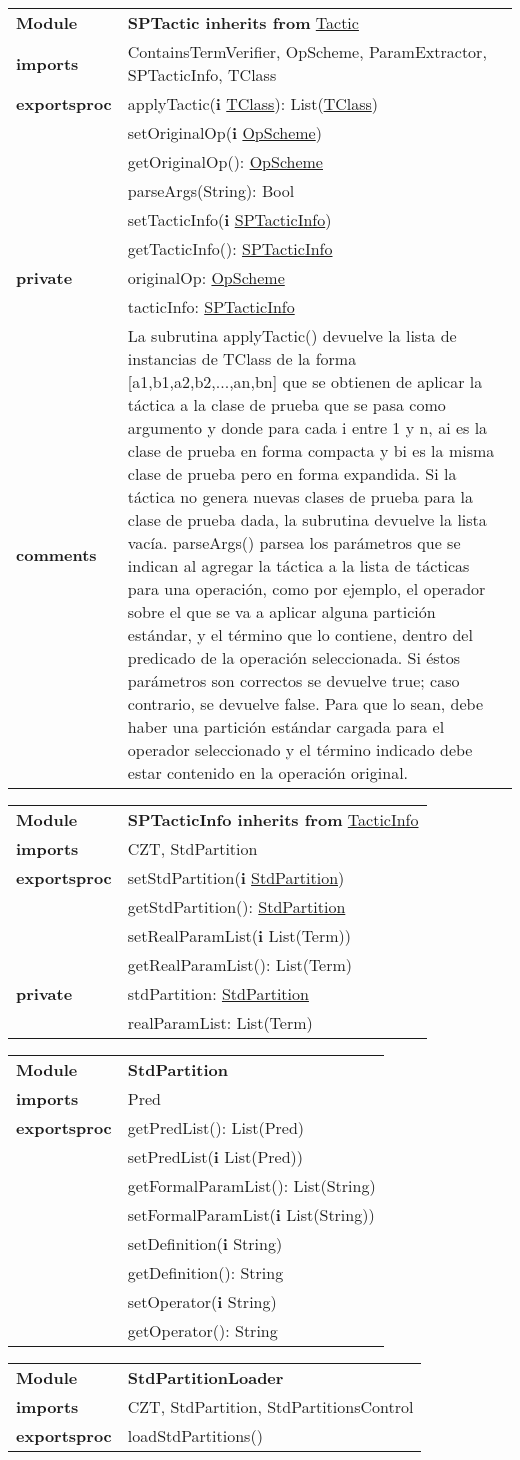 \documentclass[12pt,a4paper,fleqn]{report}
\newenvironment{module}[1]{\hypertarget{mi:#1}{} \vspace{0.5cm}\noindent\begin{tabular}{|p{0.2\textwidth} p{0.75\textwidth}|} \hline{\bf Module} & {\bf #1} \\}{\hline\end{tabular}\vspace{0.5cm}}
\newenvironment{hmodule}[2]{\hypertarget{mi:#1}{} \vspace{0.5cm}\noindent\begin{tabular}{|p{0.2\textwidth} p{0.75\textwidth}|} \hline{\bf Module} & {\bf #1 inherits from} \hyperlink{mi:#2}{#2} \\}{\hline\end{tabular}\vspace{0.5cm}}
\newcommand{\eproc}{{\bf exportsproc}}
\newcommand{\priv}{{\bf private}}
\newcommand{\proc}[1]{& #1 \\}
\newcommand{\e}[1]{{\bf i} \hyperlink{mi:#1}{#1}}
\newcommand{\eb}[1]{{\bf i} #1}
\newcommand{\imp}[1]{{\bf imports} & #1 \\}
\newcommand{\comm}[1]{{\bf comments} & #1 \\}
\newcommand{\mdr}[1]{\hyperlink{mi:#1}{#1}}
\begin{document}
\begin{hmodule}{SPTactic}{Tactic}
\imp{ContainsTermVerifier, OpScheme, ParamExtractor, SPTacticInfo, TClass}
\eproc
\proc{applyTactic(\e {TClass}): List(\mdr{TClass})}
\proc{setOriginalOp(\e {OpScheme})}
\proc{getOriginalOp(): \mdr{OpScheme}}
\proc{parseArgs(String): Bool}
\proc{setTacticInfo(\e {SPTacticInfo})}
\proc{getTacticInfo(): \mdr{SPTacticInfo}}
\priv
\proc{originalOp: \mdr{OpScheme}}
\proc{tacticInfo: \mdr{SPTacticInfo}}
\comm{La subrutina applyTactic() devuelve la lista de instancias de TClass de la forma [a1,b1,a2,b2,...,an,bn] que se obtienen de aplicar la táctica a la clase de prueba que se pasa como argumento y donde para cada i entre 1 y n, ai es la clase de prueba en forma compacta y bi es la misma clase de prueba pero en forma expandida. Si la táctica no genera nuevas clases de prueba para la clase de prueba dada, la subrutina devuelve la lista vacía. parseArgs() parsea los parámetros que se indican al agregar la táctica a la lista  de tácticas para una operación, como por ejemplo, el operador sobre el que se va a aplicar alguna partición estándar, y el término que lo contiene, dentro del predicado de la operación seleccionada. Si éstos parámetros son correctos se devuelve true; caso contrario, se devuelve false. Para que lo sean, debe haber una partición estándar cargada para el operador seleccionado y el término indicado debe estar contenido en la operación original.}
\end{hmodule}



\begin{hmodule}{SPTacticInfo}{TacticInfo}
\imp{CZT, StdPartition}
\eproc
\proc{setStdPartition(\e {StdPartition})}
\proc{getStdPartition(): \mdr{StdPartition}}
\proc{setRealParamList(\eb {List(Term)})}
\proc{getRealParamList(): List(Term)}
\priv
\proc{stdPartition: \mdr{StdPartition}}
\proc{realParamList: List(Term)}
\end{hmodule}



\begin{module}{StdPartition}
\imp{Pred}
\eproc
\proc{getPredList(): List(Pred)}
\proc{setPredList(\eb {List(Pred)})}
\proc{getFormalParamList(): List(String)}
\proc{setFormalParamList(\eb {List(String)})}
\proc{setDefinition(\eb {String})}
\proc{getDefinition(): String}
\proc{setOperator(\eb {String})}
\proc{getOperator(): String}
\end{module}


\begin{module}{StdPartitionLoader}
\imp{CZT, StdPartition, StdPartitionsControl}
\eproc
\proc{loadStdPartitions()}
\end{module}
\end{document}

